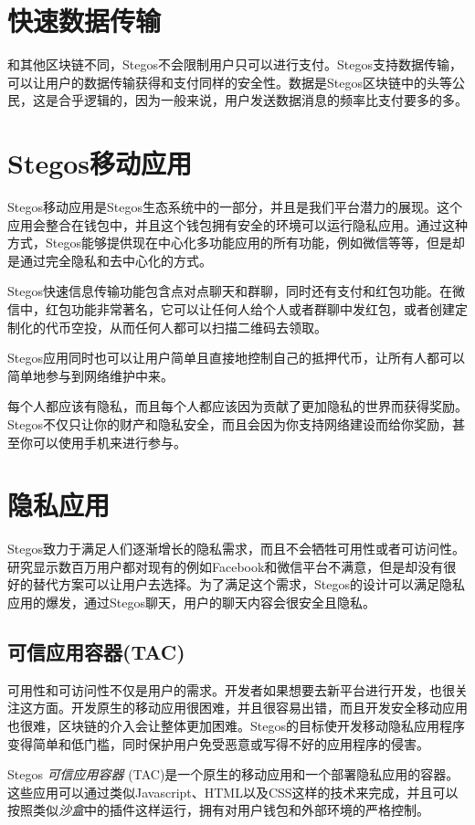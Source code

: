 \documentclass[8pt,fleqn,openany]{book}
\begin{document}
\begin{CJK*}{UTF8}{gbsn}
\section{快速数据传输}
和其他区块链不同，Stegos不会限制用户只可以进行支付。Stegos支持数据传输，可以让用户的数据传输获得和支付同样的安全性。数据是Stegos区块链中的头等公民，这是合乎逻辑的，因为一般来说，用户发送数据消息的频率比支付要多的多。

\section{Stegos移动应用}
Stegos移动应用是Stegos生态系统中的一部分，并且是我们平台潜力的展现。这个应用会整合在钱包中，并且这个钱包拥有安全的环境可以运行隐私应用。通过这种方式，Stegos能够提供现在中心化多功能应用的所有功能，例如微信等等，但是却是通过完全隐私和去中心化的方式。

Stegos快速信息传输功能包含点对点聊天和群聊，同时还有支付和红包功能。在微信中，红包功能非常著名，它可以让任何人给个人或者群聊中发红包，或者创建定制化的代币空投，从而任何人都可以扫描二维码去领取。

Stegos应用同时也可以让用户简单且直接地控制自己的抵押代币，让所有人都可以简单地参与到网络维护中来。

每个人都应该有隐私，而且每个人都应该因为贡献了更加隐私的世界而获得奖励。Stegos不仅只让你的财产和隐私安全，而且会因为你支持网络建设而给你奖励，甚至你可以使用手机来进行参与。

\section{隐私应用}
Stegos致力于满足人们逐渐增长的隐私需求，而且不会牺牲可用性或者可访问性。研究显示数百万用户都对现有的例如Facebook和微信平台不满意，但是却没有很好的替代方案可以让用户去选择。为了满足这个需求，Stegos的设计可以满足隐私应用的爆发，通过Stegos聊天，用户的聊天内容会很安全且隐私。      

\subsection{可信应用容器(TAC)}
可用性和可访问性不仅是用户的需求。开发者如果想要去新平台进行开发，也很关注这方面。开发原生的移动应用很困难，并且很容易出错，而且开发安全移动应用也很难，区块链的介入会让整体更加困难。Stegos的目标使开发移动隐私应用程序变得简单和低门槛，同时保护用户免受恶意或写得不好的应用程序的侵害。

Stegos \textit{可信应用容器} (TAC)是一个原生的移动应用和一个部署隐私应用的容器。这些应用可以通过类似Javascript、HTML以及CSS这样的技术来完成，并且可以按照类似\textit{沙盒}中的插件这样运行，拥有对用户钱包和外部环境的严格控制。


\end{CJK*}
\end{document}
